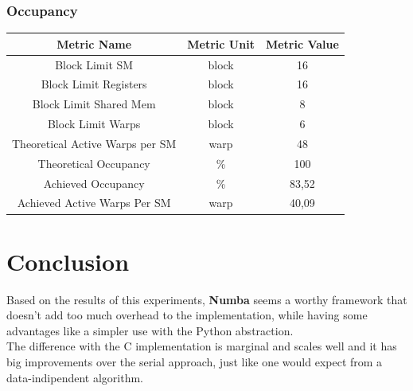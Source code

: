 \documentclass[a4paper, 12pt, oneside]{article}
\begin{document}
\subsubsection{Occupancy}

\begin{center}
  \begin{tabular}{ |c|c|c| }
    \hline
    Metric Name                     & Metric Unit & Metric Value \\
    \hline
    Block Limit SM                  & block       & 16           \\
    Block Limit Registers           & block       & 16           \\
    Block Limit Shared Mem          & block       & 8            \\
    Block Limit Warps               & block       & 6            \\
    Theoretical Active Warps per SM & warp        & 48           \\
    Theoretical Occupancy           & \%          & 100          \\
    Achieved Occupancy              & \%          & 83,52        \\
    Achieved Active Warps Per SM    & warp        & 40,09        \\
    \hline
  \end{tabular}
\end{center}

\section{Conclusion}
Based on the results of this experiments, \textbf{Numba} seems a worthy framework that doesn't add too much overhead to the implementation, while having some advantages like a simpler use with the Python abstraction.\\
The difference with the C implementation is marginal and scales well and it has big improvements over the serial approach, just like one would expect from a data-indipendent algorithm.

\printbibliography
\end{document}
